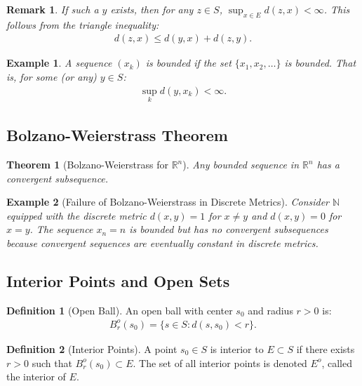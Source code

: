 \documentclass[9pt]{article}
\theoremstyle{definition}
\newtheorem{definition}{Definition}
\theoremstyle{plain}
\newtheorem{theorem}{Theorem}
\newtheorem{example}{Example}
\newtheorem{remark}{Remark}
\begin{document}
\begin{remark}
If such a $ y $ exists, then for any $ z \in S $, $ \sup_{x \in E} d(z, x) < \infty $. This follows from the triangle inequality:
\begin{align}
d(z, x) \leq d(y, x) + d(z, y).
\end{align}
\end{remark}

\begin{example}
A sequence $ (x_k) $ is bounded if the set $ \{x_1, x_2, \ldots\} $ is bounded. That is, for some (or any) $ y \in S $:
\begin{align}
\sup_k d(y, x_k) < \infty.
\end{align}
\end{example}

\subsection*{Bolzano-Weierstrass Theorem}
\begin{theorem}[Bolzano-Weierstrass for $ \mathbb{R}^n $]
Any bounded sequence in $ \mathbb{R}^n $ has a convergent subsequence.
\end{theorem}

\begin{example}[Failure of Bolzano-Weierstrass in Discrete Metrics]
Consider $ \mathbb{N} $ equipped with the discrete metric $ d(x, y) = 1 $ for $ x \neq y $ and $ d(x, y) = 0 $ for $ x = y $. The sequence $ x_n = n $ is bounded but has no convergent subsequences because convergent sequences are eventually constant in discrete metrics.
\end{example}

\subsection*{Interior Points and Open Sets}
\begin{definition}[Open Ball]
An open ball with center $ s_0 $ and radius $ r > 0 $ is:
\begin{align}
B_r^o(s_0) = \{s \in S : d(s, s_0) < r\}.
\end{align}
\end{definition}

\begin{definition}[Interior Points]
A point $ s_0 \in S $ is interior to $ E \subset S $ if there exists $ r > 0 $ such that $ B_r^o(s_0) \subset E $. The set of all interior points is denoted $ E^o $, called the interior of $ E $.
\end{definition}
\end{document}
